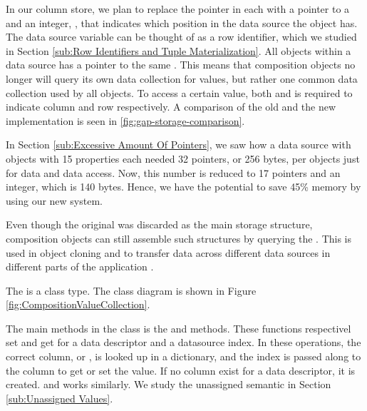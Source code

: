 In our column store, we plan to replace the  pointer in each  with a pointer to a  and an integer, , that indicates which position in the data source the object has. The data source variable can be thought of as a row identifier, which we studied in Section \ref{sub:Row Identifiers and Tuple Materialization}. All objects within a data source has a pointer to the same . This means that composition objects no longer will query its own data collection for values, but rather one common data collection used by all objects. To access a certain value, both  and  is required to indicate column and row respectively. A comparison of the old and the new implementation is seen in \ref{fig:gap-storage-comparison}.


In Section \ref{sub:Excessive Amount Of Pointers}, we saw how a data source with objects with 15 properties each needed 32 pointers, or 256 bytes, per objects just for data and data access. Now, this number is reduced to 17 pointers and an integer, which is 140 bytes. Hence, we have the potential to save 45\% memory by using our new system.

Even though the original  was discarded as the main storage structure, composition objects can still assemble such structures by querying the . This is used in object cloning and to transfer data across different data sources in different parts of the application .

The  is a class type. The class diagram is shown in Figure \ref{fig:CompositionValueCollection}.

The main methods in the  class is the  and  methods. These functions respectivel set and get  for a data descriptor and a datasource index. In these operations, the correct column, or , is looked up in a dictionary, and the index is passed along to the column to get or set the value. If no column exist for a data descriptor, it is created.  and  works similarly. We study the unassigned semantic in Section \ref{sub:Unassigned Values}. 

